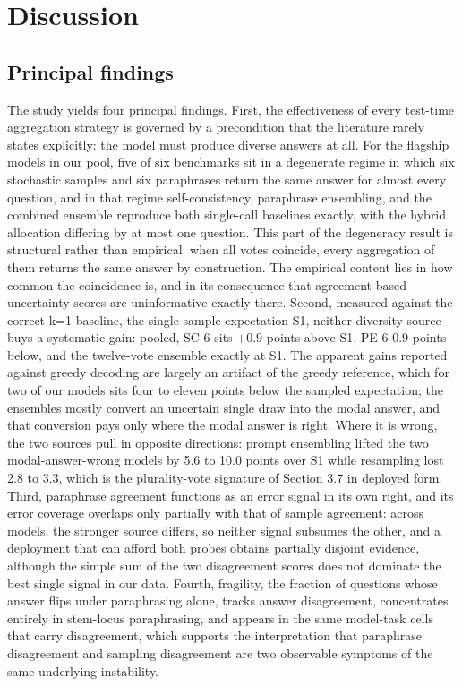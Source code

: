 \documentclass[preprint,12pt]{elsarticle}
\begin{document}
\section{Discussion}


\subsection{Principal findings}

The study yields four principal findings. First, the effectiveness of every test-time aggregation strategy is governed by a precondition that the literature rarely states explicitly: the model must produce diverse answers at all. For the flagship models in our pool, five of six benchmarks sit in a degenerate regime in which six stochastic samples and six paraphrases return the same answer for almost every question, and in that regime self-consistency, paraphrase ensembling, and the combined ensemble reproduce both single-call baselines exactly, with the hybrid allocation differing by at most one question. This part of the degeneracy result is structural rather than empirical: when all votes coincide, every aggregation of them returns the same answer by construction. The empirical content lies in how common the coincidence is, and in its consequence that agreement-based uncertainty scores are uninformative exactly there. Second, measured against the correct k=1 baseline, the single-sample expectation S1, neither diversity source buys a systematic gain: pooled, SC-6 sits $+0.9$ points above S1, PE-6 $0.9$ points below, and the twelve-vote ensemble exactly at S1. The apparent gains reported against greedy decoding are largely an artifact of the greedy reference, which for two of our models sits four to eleven points below the sampled expectation; the ensembles mostly convert an uncertain single draw into the modal answer, and that conversion pays only where the modal answer is right. Where it is wrong, the two sources pull in opposite directions: prompt ensembling lifted the two modal-answer-wrong models by 5.6 to 10.0 points over S1 while resampling lost 2.8 to 3.3, which is the plurality-vote signature of Section 3.7 in deployed form. Third, paraphrase agreement functions as an error signal in its own right, and its error coverage overlaps only partially with that of sample agreement: across models, the stronger source differs, so neither signal subsumes the other, and a deployment that can afford both probes obtains partially disjoint evidence, although the simple sum of the two disagreement scores does not dominate the best single signal in our data. Fourth, fragility, the fraction of questions whose answer flips under paraphrasing alone, tracks answer disagreement, concentrates entirely in stem-locus paraphrasing, and appears in the same model-task cells that carry disagreement, which supports the interpretation that paraphrase disagreement and sampling disagreement are two observable symptoms of the same underlying instability.
\end{document}
